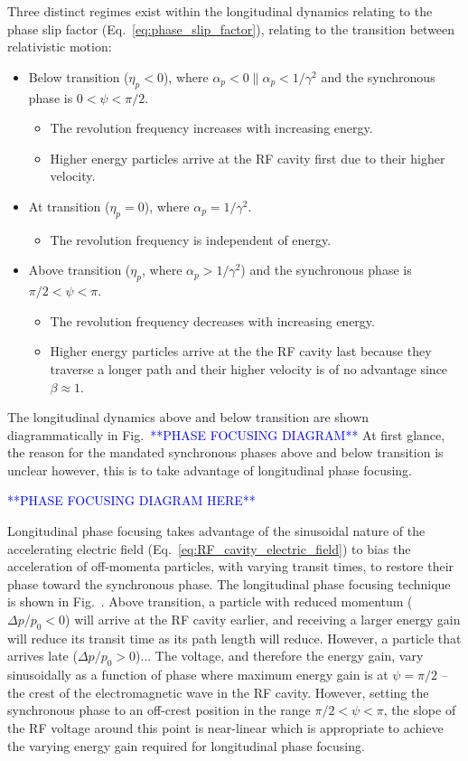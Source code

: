 \documentclass[../main.tex]{subfiles}
\begin{document}
Three distinct regimes exist within the longitudinal dynamics relating to the phase slip factor (Eq.~\ref{eq:phase_slip_factor}), relating to the transition between relativistic motion:
\begin{itemize}
    \item{Below transition ($\eta_{p}<0$), where $\alpha_{p}<0 \parallel \alpha_{p}<1/\gamma^{2}$ and the synchronous phase is $0<\psi<\pi/2$.
    \begin{itemize}
        \item{The revolution frequency increases with increasing energy.}
        \item{Higher energy particles arrive at the RF cavity first due to their higher velocity.}
    \end{itemize}}
    \item{At transition ($\eta_{p}=0$), where $\alpha_{p}=1/\gamma^{2}$.
    \begin{itemize}
        \item{The revolution frequency is independent of energy.} 
    \end{itemize}}
    \item{Above transition ($\eta_{p}$, where $\alpha_{p}>1/\gamma^{2}$) and the synchronous phase is $\pi/2<\psi<\pi$.
    \begin{itemize}
        \item{The revolution frequency decreases with increasing energy.}
        \item{Higher energy particles arrive at the the RF cavity last because they traverse a longer path and their higher velocity is of no advantage since $\beta\approx1$.}
    \end{itemize}}
\end{itemize}
The longitudinal dynamics above and below transition are shown diagrammatically in Fig.~\textcolor{blue}{**PHASE FOCUSING DIAGRAM**} At first glance, the reason for the mandated synchronous phases above and below transition is unclear however, this is to take advantage of longitudinal phase focusing. 

\textcolor{blue}{**PHASE FOCUSING DIAGRAM HERE**}

Longitudinal phase focusing takes advantage of the sinusoidal nature of the accelerating electric field (Eq.~\ref{eq:RF_cavity_electric_field}) to bias the acceleration of off-momenta particles, with varying transit times, to restore their phase toward the synchronous phase. The longitudinal phase focusing technique is shown in Fig.~\textcolor{}{}. Above transition, a particle with reduced momentum ($\Delta p/p_{0}<0$) will arrive at the RF cavity earlier, and receiving a larger energy gain will reduce its transit time  as its path length will reduce. However, a particle that arrives late ($\Delta p/p_{0}>0$)...
The voltage, and therefore the energy gain, vary sinusoidally as a function of phase where maximum energy gain is at $\psi=\pi/2$ -- the crest of the electromagnetic wave in the RF cavity. However, setting the synchronous phase to an off-crest position in the range $\pi/2<\psi<\pi$, the slope of the RF voltage around this point is near-linear which is appropriate to achieve the varying energy gain required for longitudinal phase focusing.  
\end{document}
